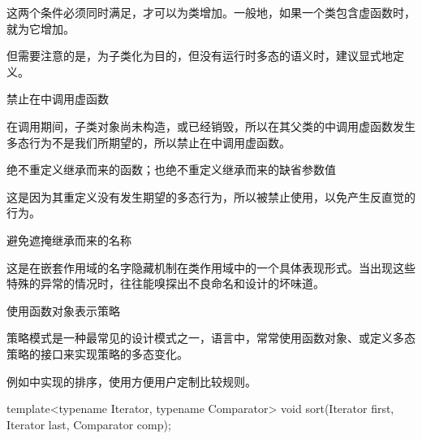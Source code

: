\begin{content}
\begin{enum}
\end{enum}

这两个条件必须同时满足，才可以为类增加。一般地，如果一个类包含虚函数时，就为它增加。

但需要注意的是，为子类化为目的，但没有运行时多态的语义时，建议显式地定义。

\begin{regulation}
禁止在中调用虚函数
\end{regulation}

在调用期间，子类对象尚未构造，或已经销毁，所以在其父类的中调用虚函数发生多态行为不是我们所期望的，所以禁止在中调用虚函数。

\begin{regulation}
绝不重定义继承而来的函数；也绝不重定义继承而来的缺省参数值
\end{regulation}

这是因为其重定义没有发生期望的多态行为，所以被禁止使用，以免产生反直觉的行为。

\begin{regulation}
避免遮掩继承而来的名称
\end{regulation}

这是在嵌套作用域的名字隐藏机制在类作用域中的一个具体表现形式。当出现这些特殊的异常的情况时，往往能嗅探出不良命名和设计的坏味道。

\begin{regulation}
使用函数对象表示策略
\end{regulation}

策略模式是一种最常见的设计模式之一，\cpp{}语言中，常常使用函数对象、或定义多态策略的接口来实现策略的多态变化。

例如中实现的排序，使用方便用户定制比较规则。

\begin{leftbar}
\begin{c++}[caption={标准库std::sort}]
template<typename Iterator, typename Comparator>
void sort(Iterator first, Iterator last, Comparator comp);
\end{c++}
\end{leftbar}

\end{content}
